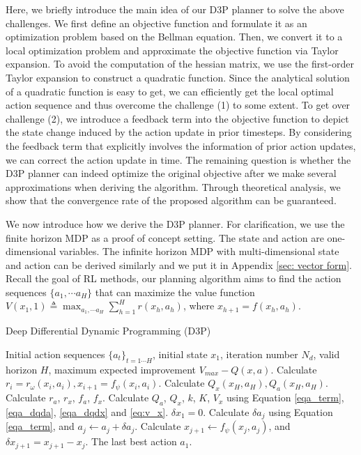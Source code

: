 \documentclass{article}
\newcommand{\vmax}{V_{max}}
\newcommand{\lijun}[1]{ {#1}}
\newcommand{\yue}[1]{ {#1}}
\begin{document}
Here, we briefly introduce the main idea of our D3P planner to solve the above challenges. We first define an objective function and formulate it as an optimization problem based on the Bellman equation. Then, we convert it to a local optimization problem and approximate the objective function via Taylor expansion.
To avoid the computation of the hessian matrix, we use the first-order Taylor expansion to construct a quadratic function. Since the analytical solution of a quadratic function is easy to get, we can efficiently get the local optimal action sequence and thus overcome the challenge (1) to some extent. To get over challenge (2), we introduce a feedback term into the objective function to depict the state change induced by the action update in prior timesteps. By considering the feedback term that explicitly involves the information of prior action updates, we can correct the action update in time. 
The remaining question is whether the D3P planner can indeed optimize the original objective after we make several approximations when deriving the algorithm. Through theoretical analysis, we show that the convergence rate of the proposed algorithm can be guaranteed.

We now introduce how we derive the D3P planner. For clarification, we use the finite horizon MDP as a proof of concept setting. \yue{The state and action are one-dimensional variables. The infinite horizon MDP with multi-dimensional state and action can be derived similarly and we put it in Appendix \ref{sec: vector form}. }
Recall the goal of RL methods, our planning algorithm aims  to find the action sequences $\{a_1,\cdots a_H \}$ that can maximize the value function \lijun{$V(x_1,1) \triangleq \max_{a_1,\cdots a_H}  \sum_{h=1}^{H} r(x_h, a_h)$, where $x_{h+1} = f(x_h,a_h)$. }

\begin{algorithm}[!tb]
\caption{Deep Differential Dynamic Programming (D3P)}
\label{algo_d3p}
\begin{algorithmic}[1]
\REQUIRE Initial action sequences $\{ a_t \}_{t=1\cdots H}$, initial state ${x}_1$, iteration number $N_d$,  valid horizon $H$, maximum expected improvement $\vmax - Q(x, a)$.
\STATE Calculate $r_i = r_\omega({x}_i, {a}_i), {x}_{i+1} = f_\psi({x}_i, {a}_i)$.
\ENDFOR
{} 
\STATE Calculate $Q_{{x}}({x}_H, {a}_H), Q_{{a}}({x}_H, {a}_H)$. 
\STATE Calculate $r_a$, $r_x$, $f_a$, $f_x$.
\STATE Calculate $Q_a$, $Q_x$, $k$, $K$, $V_x$ using Equation \ref{eqa_term}, \ref{eqa_dqda}, \ref{eqa_dqdx} and \ref{eq:v_x}.
\ENDFOR
\STATE $\delta{x}_1=0$. 
\STATE Calculate $\delta{a}_j$ using Equation \ref{eqa_term}, and ${a}_j\leftarrow {a}_j+ \delta {a}_j$.
\STATE Calculate ${x}_{j+1} \leftarrow f_\psi({x}_j, {a}_j)$, and $\delta {x}_{j+1}= {x}_{j+1} - {x}_{j}$.
\ENDFOR
\ENDFOR
\RETURN The last best action ${a}_1$.
\end{algorithmic}

\end{algorithm}
\end{document}
